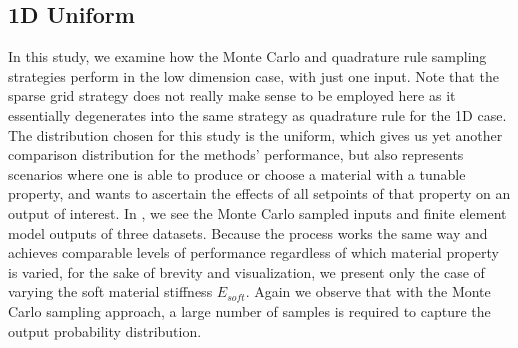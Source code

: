 \documentclass[preprint,review,12pt]{elsarticle}
\begin{document}
    

\subsection{1D Uniform}
\label{subsec:1D Uniform Input Space Study}
In this study, we examine how the Monte Carlo and quadrature rule sampling strategies perform in the low dimension case, with just one input. Note that the sparse grid strategy does not really make sense to be employed here as it essentially degenerates into the same strategy as quadrature rule for the 1D case. The distribution chosen for this study is the uniform, which gives us yet another comparison distribution for the methods' performance, but also represents scenarios where one is able to produce or choose a material with a tunable property, and wants to ascertain the effects of all setpoints of that property on an output of interest. In , we see the Monte Carlo sampled inputs and finite element model outputs of three datasets. Because the process works the same way and achieves comparable levels of performance regardless of which material property is varied, for the sake of brevity and visualization, we present only the case of varying the soft material stiffness \(E_{soft}\). Again we observe that with the Monte Carlo sampling approach, a large number of samples is required to capture the output probability distribution. 
\end{document}
